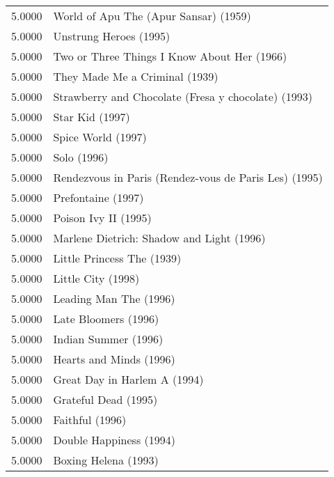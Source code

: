 \begin{flushleft}

\begin{table}[h]
\centering
\begin{tabular}{ll}
5.0000 & World of Apu The (Apur Sansar) (1959)                 \\
5.0000 & Unstrung Heroes (1995)                                \\
5.0000 & Two or Three Things I Know About Her (1966)           \\
5.0000 & They Made Me a Criminal (1939)                        \\
5.0000 & Strawberry and Chocolate (Fresa y chocolate) (1993)   \\
5.0000 & Star Kid (1997)                                       \\
5.0000 & Spice World (1997)                                    \\
5.0000 & Solo (1996)                                           \\
5.0000 & Rendezvous in Paris (Rendez-vous de Paris Les) (1995) \\
5.0000 & Prefontaine (1997)                                    \\
5.0000 & Poison Ivy II (1995)                                  \\
5.0000 & Marlene Dietrich: Shadow and Light (1996)             \\
5.0000 & Little Princess The (1939)                            \\
5.0000 & Little City (1998)                                    \\
5.0000 & Leading Man The (1996)                                \\
5.0000 & Late Bloomers (1996)                                  \\
5.0000 & Indian Summer (1996)                                  \\
5.0000 & Hearts and Minds (1996)                               \\
5.0000 & Great Day in Harlem A (1994)                          \\
5.0000 & Grateful Dead (1995)                                  \\
5.0000 & Faithful (1996)                                       \\
5.0000 & Double Happiness (1994)                               \\
5.0000 & Boxing Helena (1993)                                  \\

\end{tabular}
\end{table}
\end{flushleft}
